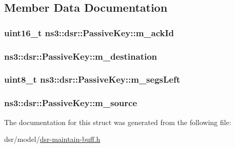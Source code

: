 \subsection{Member Data Documentation}
\subsubsection[{\texorpdfstring{m\+\_\+ack\+Id}{m_ackId}}]{\setlength{\rightskip}{0pt plus 5cm}uint16\+\_\+t ns3\+::dsr\+::\+Passive\+Key\+::m\+\_\+ack\+Id}\hypertarget{structns3_1_1dsr_1_1PassiveKey_af7c4196fee6a90ac6136f57c380f21cf}{}\label{structns3_1_1dsr_1_1PassiveKey_af7c4196fee6a90ac6136f57c380f21cf}
\subsubsection[{\texorpdfstring{m\+\_\+destination}{m_destination}}]{ ns3\+::dsr\+::\+Passive\+Key\+::m\+\_\+destination}\hypertarget{structns3_1_1dsr_1_1PassiveKey_a3b7bc9fdf37087cae84e8792c89027d2}{}\label{structns3_1_1dsr_1_1PassiveKey_a3b7bc9fdf37087cae84e8792c89027d2}
\subsubsection[{\texorpdfstring{m\+\_\+segs\+Left}{m_segsLeft}}]{\setlength{\rightskip}{0pt plus 5cm}uint8\+\_\+t ns3\+::dsr\+::\+Passive\+Key\+::m\+\_\+segs\+Left}\hypertarget{structns3_1_1dsr_1_1PassiveKey_abf5474b90f50af2385b6423eb9ec4793}{}\label{structns3_1_1dsr_1_1PassiveKey_abf5474b90f50af2385b6423eb9ec4793}
\subsubsection[{\texorpdfstring{m\+\_\+source}{m_source}}]{ ns3\+::dsr\+::\+Passive\+Key\+::m\+\_\+source}\hypertarget{structns3_1_1dsr_1_1PassiveKey_a43436e6986b6008da86683cfa9c93ec0}{}\label{structns3_1_1dsr_1_1PassiveKey_a43436e6986b6008da86683cfa9c93ec0}


The documentation for this struct was generated from the following file\+:\begin{DoxyCompactItemize}
\item 
dsr/model/\hyperlink{dsr-maintain-buff_8h}{dsr-\/maintain-\/buff.\+h}\end{DoxyCompactItemize}
